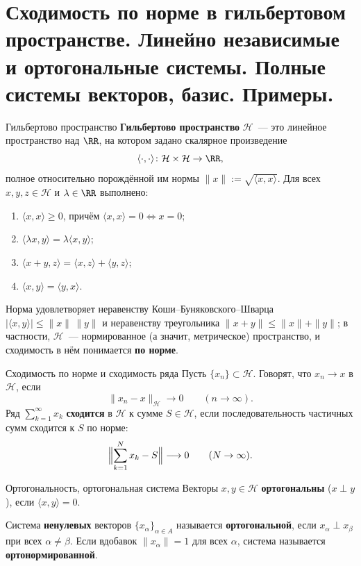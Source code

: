 
\section{Сходимость по норме в гильбертовом пространстве. Линейно независимые и ортогональные системы. Полные системы векторов, базис. Примеры.}

\begin{Definition}[required]{Гильбертово пространство}{}
	\textbf{Гильбертово пространство} $\mathcal{H}$~--- это линейное пространство над $\RR$, на котором задано скалярное произведение
	\[
	\langle \cdot, \cdot \rangle \colon \mathcal{H} \times \mathcal{H} \to \RR,
	\]
	полное относительно порождённой им нормы $\|x\| := \sqrt{\langle x, x \rangle}$. Для всех $x,y,z \in \mathcal{H}$ и $\lambda \in \RR$ выполнено:
	\begin{enumerate}
		\item $\langle x, x \rangle \ge 0$, причём $\langle x, x \rangle = 0 \Leftrightarrow x = 0$;
		\item $\langle \lambda x, y \rangle = \lambda \langle x, y \rangle$;
		\item $\langle x + y, z \rangle = \langle x, z \rangle + \langle y, z \rangle$;
		\item $\langle x, y \rangle = \langle y, x \rangle$.
	\end{enumerate}
\end{Definition}

Норма удовлетворяет неравенству Коши--Буняковского--Шварца $|\langle x,y\rangle|\le\|x\|\,\|y\|$ и неравенству треугольника $\|x+y\|\le\|x\|+\|y\|$; в частности, $\mathcal{H}$~--- нормированное (а значит, метрическое) пространство, и сходимость в нём понимается \textbf{по норме}.

\begin{Definition}{Сходимость по норме и сходимость ряда}{}
	Пусть $\{x_n\}\subset\mathcal{H}$. Говорят, что $x_n \longrightarrow x$ в $\mathcal{H}$, если
	\[
	\|x_n - x\|_{\mathcal{H}} \longrightarrow 0 \qquad (n \to \infty).
	\]
	Ряд $\sum_{k=1}^{\infty} x_k$ \textbf{сходится} в $\mathcal{H}$ к сумме $S \in \mathcal{H}$, если последовательность частичных сумм сходится к $S$ по норме:
	\[
	\Bigl\| \sum_{k=1}^{N} x_k - S \Bigr\| \longrightarrow 0 \qquad (N \to \infty).
	\]
\end{Definition}

\begin{Definition}{Ортогональность, ортогональная система}{}
	Векторы $x,y \in \mathcal{H}$ \textbf{ортогональны} ($x \perp y$), если $\langle x, y \rangle = 0$.

	Система \textbf{ненулевых} векторов $\{x_\alpha\}_{\alpha \in A}$ называется \textbf{ортогональной}, если $x_\alpha \perp x_\beta$ при всех $\alpha \neq \beta$. Если вдобавок $\|x_\alpha\| = 1$ для всех $\alpha$, система называется \textbf{ортонормированной}.
\end{Definition}

